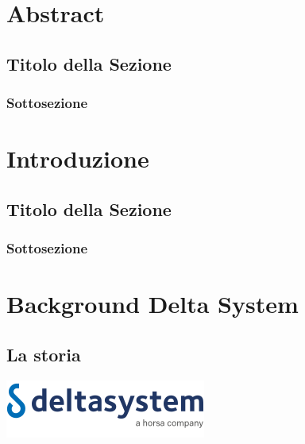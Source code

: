 \documentclass[target=bach,aauheader=,style=]{thud}
\begin{document}
\chapter{Abstract}

\section{Titolo della Sezione}

\subsection{Sottosezione}

\chapter{Introduzione}

\section{Titolo della Sezione}

\subsection{Sottosezione}


\chapter{Background Delta System}

\section{La storia}
\includegraphics[scale=1]{deltasystem.png}
\end{document}
